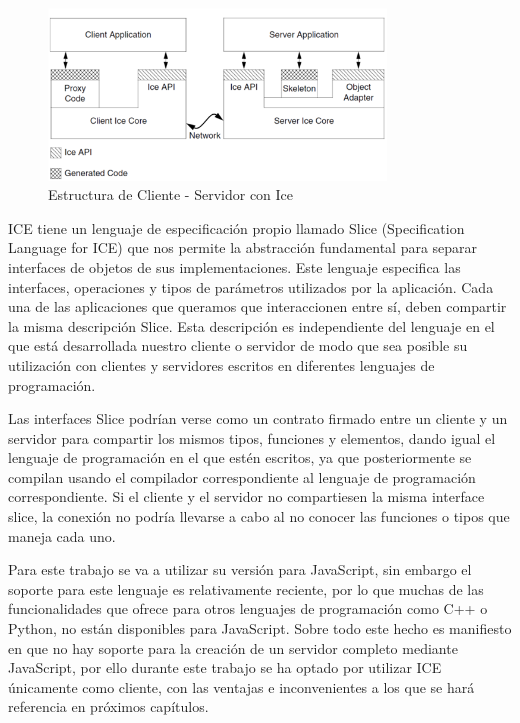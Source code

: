 \begin{figure}[H]
  \begin{center}
    \includegraphics[width=0.8\textwidth]{figures/estructuraice.png}
		\caption{Estructura de Cliente - Servidor con Ice}
		\label{fig.estructurarice}
		\end{center}
\end{figure}

ICE tiene un lenguaje de especificación propio llamado Slice (Specification Language for ICE) que nos permite la abstracción fundamental para separar interfaces de objetos de sus implementaciones. Este lenguaje especifica las interfaces, operaciones y tipos de parámetros utilizados por la aplicación. Cada una de las aplicaciones que queramos que interaccionen entre sí, deben compartir la misma descripción Slice. Esta descripción es independiente del lenguaje en el que está desarrollada nuestro cliente o servidor de modo que sea posible su utilización con clientes y servidores escritos en diferentes lenguajes de programación.

Las interfaces Slice podrían verse como un contrato firmado entre un cliente y un servidor para compartir los mismos tipos, funciones y elementos, dando igual el lenguaje de programación en el que estén escritos, ya que posteriormente se compilan usando el compilador correspondiente al lenguaje de programación correspondiente. Si el cliente y el servidor no compartiesen la misma interface slice, la conexión no podría llevarse a cabo al no conocer las funciones o tipos que maneja cada uno.

Para este trabajo se va a utilizar su versión para JavaScript, sin embargo el soporte para este lenguaje es relativamente reciente, por lo que muchas de las funcionalidades que ofrece para otros lenguajes de programación como C++ o Python, no están disponibles para JavaScript. Sobre todo este hecho es manifiesto en que no hay soporte para la creación de un servidor completo mediante JavaScript, por ello durante este trabajo se ha optado por utilizar ICE únicamente como cliente, con las ventajas e inconvenientes a los que se hará referencia en próximos capítulos.

